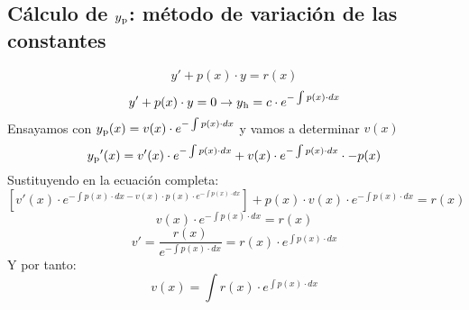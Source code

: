 \documentclass{article}
\begin{document}
\subsection{Cálculo de $y\textsubscript{p}$: método de variación de las constantes}
\[y'+p(x)\cdot y=r(x)\]
\[y'+p(x)\cdot y=0 \rightarrow y\textsubscript{h}=c\cdot e^{-\int p(x)\cdot dx}\]
Ensayamos con $y\textsubscript{p}(x)=v(x)\cdot e^{-\int p(x)\cdot dx}$ y vamos a determinar $v(x)$
\[y\textsubscript{p}'(x) = v'(x)\cdot e^{-\int p(x)\cdot dx}+v(x) \cdot e^{-\int p(x)\cdot dx} \cdot -p(x)\]
Sustituyendo en la ecuación completa:
\[ [v'(x)\cdot e^{-\int p(x)\cdot dx- v(x)\cdot p(x) \cdot e^{-\int p(x)\cdot dx}}]+p(x)\cdot v(x)\cdot e^{-\int p(x)\cdot dx}=r(x)\]
\[v(x)\cdot e^{-\int p(x)\cdot dx}=r(x)\]
\[v'=\frac{r(x)}{ e^{-\int p(x)\cdot dx}}=r(x)\cdot e^{\int p(x)\cdot dx}\]
Y por tanto:
\[v(x)=\int r(x)\cdot e^{\int p(x)\cdot dx}\]
\end{document}
